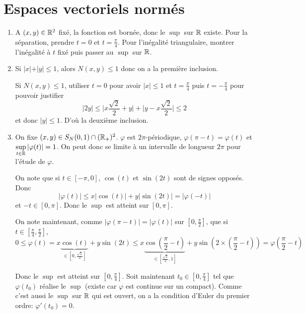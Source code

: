\section{Espaces vectoriels normés}

\begin{solution}
	\phantom{}
	\begin{enumerate}
		\item A $(x,y)\in\mathbb{R}^{2}$ fixé, la fonction 
		est bornée, donc le $\sup$ sur $\mathbb{R}$ existe. Pour la séparation, prendre $t=0$ et $t=\frac{\pi}{4}$. Pour l'inégalité triangulaire, montrer l'inégalité à $t$ fixé puis passer au $\sup$ sur $\mathbb{R}$.
		
		\item Si $\vert x\vert+\vert y\vert\leqslant1$, alors $N(x,y)\leqslant 1$ donc on a la première inclusion. 
		
		Si $N(x,y)\leqslant 1$, utiliser $t=0$ pour avoir $\vert x\vert\leqslant1$ et $t=\frac{\pi}{4}$ puis $t=-\frac{\pi}{4}$ pour pouvoir justifier
		$$\vert 2y\vert\leqslant \Biggl\vert x\frac{\sqrt{2}}{2}+y\Biggr\vert+\Biggl\vert y-x\frac{\sqrt{2}}{2}\Biggr\vert\leqslant 2$$
		et donc $\vert y\vert\leqslant1$. D'où la deuxième inclusion. 

		\item On fixe $(x,y)\in S_{N}(0,1)\cap(\mathbb{R}_{+})^{2}$. $\varphi$ est $2\pi$-périodique, $\varphi(\pi-t)=\varphi(t)$ et $\sup\limits_{t\in\mathbb{R}}\vert\varphi(t)\vert=1$. On peut donc se limite à un intervalle de longueur $2\pi$ pour l'étude de $\varphi$. 
		
		On note que si $t\in[-\pi,0]$, $\cos(t)$ et $\sin(2t)$ sont de signes opposés. Donc
		$$\vert\varphi(t)\vert\leqslant x\vert\cos(t)\vert+y\vert\sin(2t)\vert=\vert\varphi(-t)\vert$$
		et $-t\in[0,\pi]$. Donc le $\sup$ est atteint sur $[0,\pi]$.

		On note maintenant, comme $\vert\varphi(\pi-t)\vert=\vert\varphi(t)\vert$ sur $[0,\frac{\pi}{2}]$, que si $t\in[\frac{\pi}{4},\frac{\pi}{2}]$,
		$$0\leqslant\varphi(t)=x\underbrace{\cos(t)}_{\in[0,\frac{\sqrt{2}}{2}]}+y\sin(2t)\leqslant x\underbrace{\cos(\frac{\pi}{2}-t)}_{\in[\frac{\sqrt{2}}{2},1]}+y\sin(2\times (\frac{\pi}{2}-t))=\varphi(\frac{\pi}{2}-t)$$

		Donc le $\sup$ est atteint sur $[0,\frac{\pi}{4}]$. Soit maintenant $t_{0}\in[0,\frac{\pi}{4}]$ tel que $\varphi(t_{0})$ réalise le $\sup$ (existe car $\varphi$ est continue sur un compact). Comme c'est aussi le $\sup$ sur $\mathbb{R}$ qui est ouvert, on a la condition d'Euler du premier ordre: $\varphi'(t_{0})=0$.


\end{enumerate}
\end{solution}
